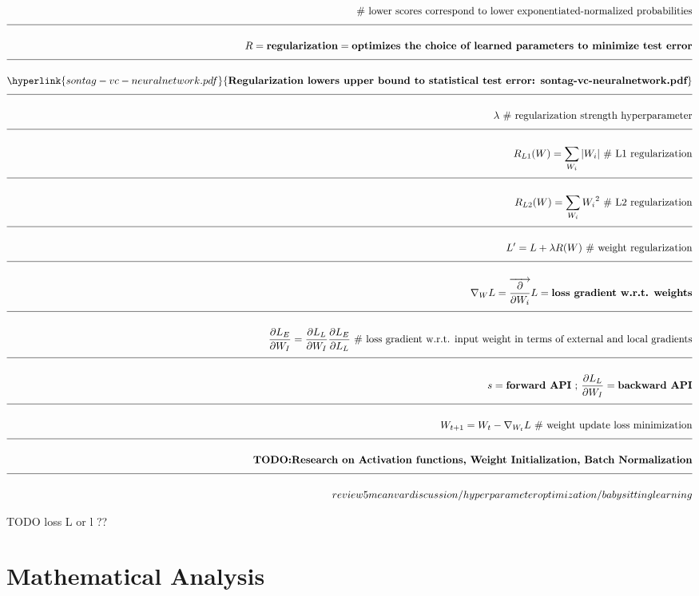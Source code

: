 \documentclass[a4paper]{article}
\newcommand{\eqComment}[1]{\text{  \# #1}}
\newcommand{\eqSep}{\text{ ;  }}
\newcommand{\n}{\\[1.5ex] \hline \nonumber \\[0ex]}
\newcommand{\m}{\nonumber \\}
\begin{document}
\begin{tcolorbox}
\begin{align}
\m \eqComment{lower scores correspond to lower exponentiated-normalized probabilities}
\n R = \textbf{regularization} = \textbf{optimizes the choice of learned parameters to minimize test error}
\n \hyperlink{sontag-vc-neuralnetwork.pdf}{\textbf{Regularization lowers upper bound to statistical test error: sontag-vc-neuralnetwork.pdf}}
\n \lambda \eqComment{regularization strength hyperparameter}
\n R_{L1}(W) = \sum_{W_i} |W_i| \eqComment{L1 regularization}
\n R_{L2}(W) = \sum_{W_i} {W_i}^2 \eqComment{L2 regularization}
\n L^\prime = L + \lambda R(W) \eqComment{weight regularization}
\n \nabla_W L = \overrightarrow{\frac{\partial}{\partial W_i}} L = \textbf{loss gradient w.r.t. weights}
\n \frac{\partial L_E}{\partial W_I} = \frac{\partial L_L}{\partial W_I} \frac{\partial L_E}{\partial L_L} \eqComment{loss gradient w.r.t. input weight in terms of external and local gradients}
\n s = \textbf{forward API} \eqSep \frac{\partial L_L}{\partial W_I} = \textbf{backward API}
\n W_{t+1} = W_{t} - \nabla_{W_t} L \eqComment{weight update loss minimization}
\n \textbf{TODO:Research on Activation functions, Weight Initialization, Batch Normalization}
\n review 5 mean var discussion / hyperparameter optimization / babysitting learning
\end{align}
\end{tcolorbox}
TODO loss L or l ??



\section{Mathematical Analysis}
\end{document}
